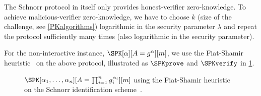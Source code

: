 The Schnorr protocol in itself only provides honest-verifier zero-knowledge.
To achieve malicious-verifier zero-knowledge, we have to choose \(k\) (size of 
the challenge, see \cref{PKalgorithms}) logarithmic in the security parameter 
\(\lambda\) and repeat the protocol sufficiently many times (also logarithmic in 
the security parameter).

For the non-interactive instance, \(\SPK[\alpha][A = g^\alpha][m]\), we use the 
Fiat-Shamir heuristic~\cite{FiatShamirHeuristic} on the above protocol, 
illustrated as \(\SPKprove\) and \(\SPKverify\) in \cref{SPKalgorithms}.

\begin{figure}
  \small
  \begin{algorithmic}
      \EndFor{}
    \EndFunction{}
  \end{algorithmic}

  \begin{algorithmic}
        \State{\Return{$\top$}}
      \EndIf{}
      \State{\Return{$\bot$}}
    \EndFunction{}
  \end{algorithmic}
  \caption{%
    \(\SPK[\alpha_1, \dotsc, \alpha_n][A = \prod_{i=1}^n g_i^{\alpha_i}][m]\) 
    using the Fiat-Shamir heuristic on the Schnorr identification 
    scheme~\cite{Camenisch-phdthesis}.
  }%
  \label{SPKalgorithms}
\end{figure}

